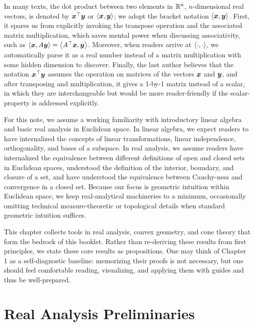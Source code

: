 \documentclass[12pt]{report}
\begin{document}
In many texts, the dot product between two elements in $\mathbb R^n$, $n$-dimensional real vectors, is denoted by ${\boldsymbol x}^\top {\boldsymbol y}$ or $\left\langle{\boldsymbol x}, {\boldsymbol y}\right\rangle$; we adopt the bracket notation $\left\langle{\boldsymbol x}, {\boldsymbol y}\right\rangle$. First, it spares us from explicitly invoking the transpose operation and the associated matrix multiplication, which saves mental power when discussing associativity, such as $\left\langle{\boldsymbol x}, A{\boldsymbol y}\right\rangle = \left\langle A^\top{\boldsymbol x}, {\boldsymbol y}\right\rangle$. Moreover, when readers arrive at $\left\langle\cdot, \cdot\right\rangle$, we automatically parse it as a real number instead of a matrix multiplication with some hidden dimension to discover. Finally, the last author believes that the notation ${\boldsymbol x}^\top {\boldsymbol y}$ assumes the operation on matrices of the vectors ${\boldsymbol x}$ and ${\boldsymbol y}$, and after transposing and multiplication, it gives a 1-by-1 matrix instead of a scalar, in which they are interchangeable but would be more reader-friendly if the scalar-property is addressed explicitly. 


For this note, we assume a working familiarity with introductory linear algebra and basic real analysis in Euclidean space. In linear algebra, we expect readers to have internalized the concepts of linear transformations, linear independence, orthogonality, and bases of a subspace. In real analysis, we assume readers have internalized the equivalence between different definitions of open and closed sets in Euclidean spaces, understood the definition of the interior, boundary, and closure of a set, and have understood the equivalence between Cauchy-ness and convergence in a closed set. Because our focus is geometric intuition within Euclidean space, we keep real-analytical machineries to a minimum, occasionally omitting technical measure-theoretic or topological details when standard geometric intuition suffices. 

This chapter collects tools in real analysis, convex geometry, and cone theory that form the bedrock of this booklet. Rather than re-deriving these results from first principles, we state these core results as propositions. One may think of Chapter 1 as a self-diagnostic baseline: memorizing their proofs is not necessary, but one should feel comfortable reading, visualizing, and applying them with guides and thus be well-prepared. 

\section{Real Analysis Preliminaries}\label{chapter: prelim}

\end{document}
